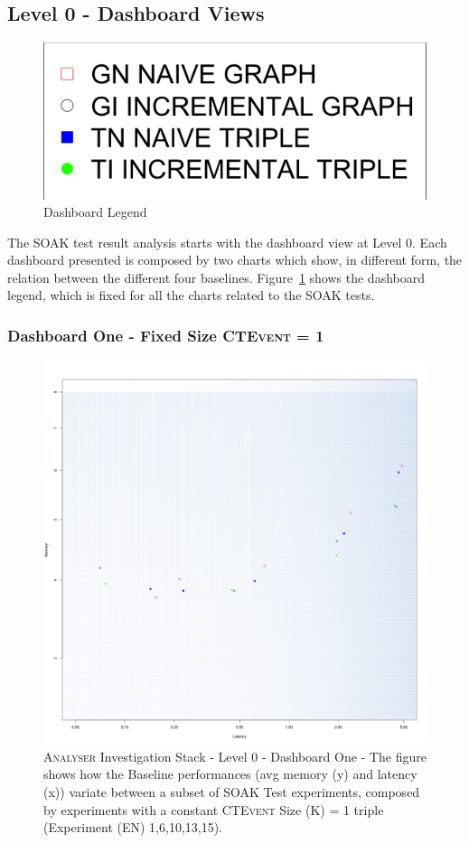 \subsection{Level 0 - Dashboard Views}\label{sec:eval-level0}

\begin{figure}[htb]
	\centering
	\includegraphics[width=0.25\linewidth]{images/dashboard-legend}	
	\caption{Dashboard Legend} 
	\label{fig:dashboard-legend}
\end{figure}

The SOAK test result analysis starts with the dashboard view at Level 0. Each dashboard presented is composed by two charts which show, in different form, the relation between the different four baselines.  Figure~\ref{fig:dashboard-legend} shows the dashboard legend, which is fixed for all the charts related to the SOAK tests.

\subsubsection{Dashboard One - Fixed Size \textsc{CTEvent} = 1} 

\begin{figure}[h!tb]
	\centering
	\includegraphics[width=0.85\linewidth]{images/dashboard-1}	
	\caption[\textsc{Analyser} Investigation Stack - Level 0 - Dashboard One - Multiplot Version]{\textsc{Analyser} Investigation Stack - Level 0 - Dashboard One - The figure shows how the Baseline performances (avg memory (y) and latency (x)) variate between a subset of SOAK Test experiments, composed by experiments with a constant \textsc{CTEvent} Size (K) = 1 triple (Experiment (EN) 1,6,10,13,15).} %
	\label{fig:result_dashboard_kb}
\end{figure}

